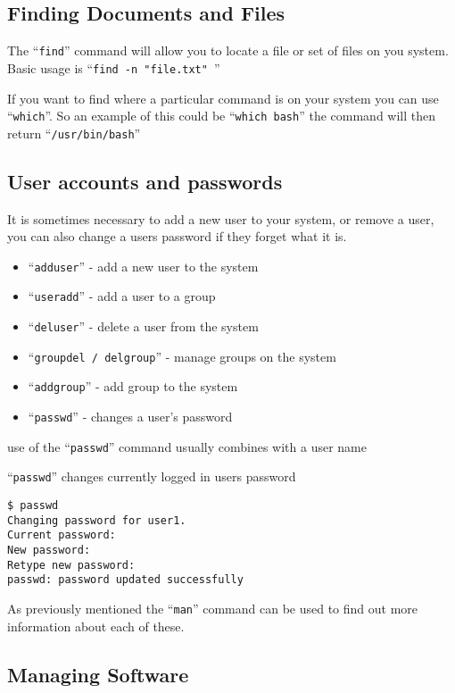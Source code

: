 \documentclass{book}
\begin{document}
\subsection{Finding Documents and Files}

The ``\verb|find|'' command will allow you to locate a file or set of files on you system. Basic usage is ``\verb|find -n "file.txt" |''

If you want to find where a particular command is on your system you can use ``\verb|which|''. So an example of this could be ``\verb|which bash|'' the command will then return ``\verb|/usr/bin/bash|''

\subsection{User accounts and passwords}

It is sometimes necessary to add a new user to your system, or remove a user, you can also change a users password if they forget what it is.

\begin{itemize}
\item ``\verb|adduser|'' - add a new user to the system
\item ``\verb|useradd|'' - add a user to a group
\item ``\verb|deluser|'' - delete a user from the system
\item ``\verb|groupdel / delgroup|'' - manage groups on the system
\item ``\verb|addgroup|'' - add group to the system
\item ``\verb|passwd|'' - changes a user's password
\end{itemize}

use of the ``\verb|passwd|'' command usually combines with a user name

``\verb|passwd|'' changes currently logged in users password

\begin{verbatim}
$ passwd
Changing password for user1.
Current password:
New password:
Retype new password:
passwd: password updated successfully
\end{verbatim}

As previously mentioned the ``\verb|man|'' command can be used to find out more information about each of these.

\subsection{Managing Software}
\end{document}
